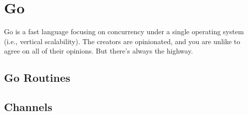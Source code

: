 \section{Go}

 Go is a fast language focusing on concurrency under a single operating system (i.e., vertical scalability). The creators are opinionated, and you are unlike to agree on all of their opinions. But there's always the highway.

\subsection{Go Routines}
\subsection{Channels}

